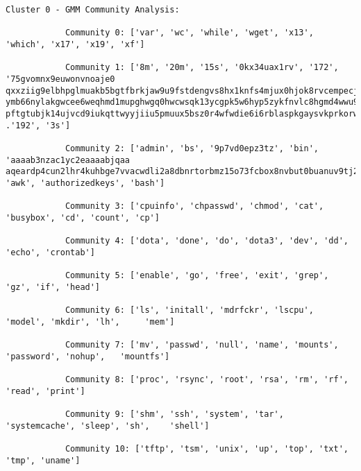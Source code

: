     \begin{lstlisting}[caption={Cluster 0 - GMM Community Analysis}, label={lst:cluster-0-gmm-community-analysis}]
            Cluster 0 - GMM Community Analysis:
            
            Community 0: ['var', 'wc', 'while', 'wget', 'x13', 'which', 'x17', 'x19', 'xf']

            Community 1: ['8m', '20m', '15s', '0kx34uax1rv', '172', '75gvomnx9euwonvnoaje0 qxxziig9elbhpglmuakb5bgtfbrkjaw9u9fstdengvs8hx1knfs4mjux0hjok8rvcempecjdys ymb66nylakgwcee6weqhmd1mupghwgq0hwcwsqk13ycgpk5w6hyp5zykfnvlc8hgmd4wwu97k6 pftgtubjk14ujvcd9iukqttwyyjiiu5pmuux5bsz0r4wfwdie6i6rblaspkgaysvkprkorw',  .'192', '3s']

            Community 2: ['admin', 'bs', '9p7vd0epz3tz', 'bin', 'aaaab3nzac1yc2eaaaabjqaa aqeardp4cun2lhr4kuhbge7vvacwdli2a8dbnrtorbmz15o73fcbox8nvbut0buanuv9tj2',  'awk', 'authorizedkeys', 'bash']

            Community 3: ['cpuinfo', 'chpasswd', 'chmod', 'cat', 'busybox', 'cd', 'count', 'cp']

            Community 4: ['dota', 'done', 'do', 'dota3', 'dev', 'dd', 'echo', 'crontab']

            Community 5: ['enable', 'go', 'free', 'exit', 'grep', 'gz', 'if', 'head']

            Community 6: ['ls', 'initall', 'mdrfckr', 'lscpu', 'model', 'mkdir', 'lh',     'mem']

            Community 7: ['mv', 'passwd', 'null', 'name', 'mounts', 'password', 'nohup',   'mountfs']

            Community 8: ['proc', 'rsync', 'root', 'rsa', 'rm', 'rf', 'read', 'print']

            Community 9: ['shm', 'ssh', 'system', 'tar', 'systemcache', 'sleep', 'sh',    'shell']

            Community 10: ['tftp', 'tsm', 'unix', 'up', 'top', 'txt', 'tmp', 'uname']
    
    \end{lstlisting}
    
    \clearpage
    
    \clearpage
    